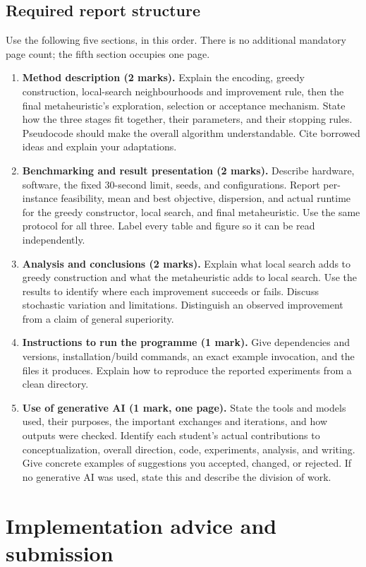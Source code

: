 \documentclass[11pt,a4paper]{article}
\begin{document}
\subsection{Required report structure}
Use the following five sections, in this order. There is no additional mandatory page count; the fifth section occupies one page.
\begin{enumerate}
\item \textbf{Method description (2 marks).} Explain the encoding, greedy construction, local-search neighbourhoods and improvement rule, then the final metaheuristic's exploration, selection or acceptance mechanism. State how the three stages fit together, their parameters, and their stopping rules. Pseudocode should make the overall algorithm understandable. Cite borrowed ideas and explain your adaptations.
\item \textbf{Benchmarking and result presentation (2 marks).} Describe hardware, software, the fixed 30-second limit, seeds, and configurations. Report per-instance feasibility, mean and best objective, dispersion, and actual runtime for the greedy constructor, local search, and final metaheuristic. Use the same protocol for all three. Label every table and figure so it can be read independently.
\item \textbf{Analysis and conclusions (2 marks).} Explain what local search adds to greedy construction and what the metaheuristic adds to local search. Use the results to identify where each improvement succeeds or fails. Discuss stochastic variation and limitations. Distinguish an observed improvement from a claim of general superiority.
\item \textbf{Instructions to run the programme (1 mark).} Give dependencies and versions, installation/build commands, an exact example invocation, and the files it produces. Explain how to reproduce the reported experiments from a clean directory.
\item \textbf{Use of generative AI (1 mark, one page).} State the tools and models used, their purposes, the important exchanges and iterations, and how outputs were checked. Identify each student's actual contributions to conceptualization, overall direction, code, experiments, analysis, and writing. Give concrete examples of suggestions you accepted, changed, or rejected. If no generative AI was used, state this and describe the division of work.
\end{enumerate}


\section{Implementation advice and submission}
\end{document}

